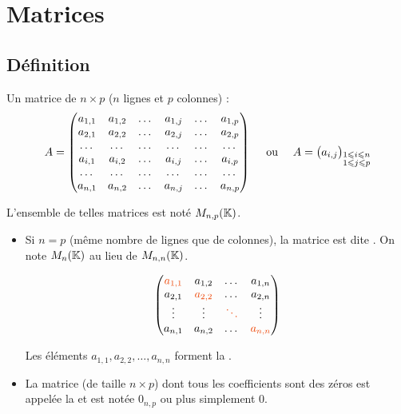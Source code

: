 \documentclass[10pt,class=article,crop=false]{standalone}
\begin{document}
	
\section{Matrices}

\begin{multicols}{2}


\subsection{Définition}


Un matrice de  $n \times p$ ($n$ lignes et $p$ colonnes) : 
$$A=\begin{pmatrix}
	a_{1,1}& a_{1,2}& \dots & a_{1,j}& \dots & a_{1,p}\cr
	a_{2,1}& a_{2,2}& \dots & a_{2,j}& \dots &a_{2,p}\cr
	\dots & \dots & \dots & \dots & \dots & \dots \cr
	a_{i,1}& a_{i,2} & \dots & a_{i,j}& \dots &a_{i,p} \cr
	\dots & \dots & \dots & \dots & \dots & \dots \cr
	a_{n,1}& a_{n,2}& \dots & a_{n,j}& \dots & a_{n,p}\cr
\end{pmatrix}
\quad \text{ ou } \quad
A= \big(a_{i,j}\big)_{\substack{1\leq i \leq n \\ 1\leq j \leq p}}
$$


L'ensemble de telles matrices est noté $M_{n,p}(\Kk)$.



\begin{itemize}
	\item Si $n=p$ (même nombre de lignes que de colonnes), la matrice est dite 
	.
	On note $M_{n}(\Kk)$ au lieu de $M_{n,n}(\Kk)$.
	
	\[
	\begin{pmatrix}
		{\color{myred}a_{1,1}} & a_{1,2} & \dots & a_{1,n}\\
		a_{2,1} & {\color{myred}a_{2,2}} & \dots & a_{2,n}\\
		\vdots& \vdots & {\color{myred}\ddots}  & \vdots\\
		a_{n,1} & a_{n,2} & \dots & {\color{myred}a_{n,n}}
	\end{pmatrix}
	\]
	
	Les éléments $a_{1,1}, a_{2,2}, \ldots, a_{n,n}$ forment la .
	

	\item La matrice (de taille $n\times p$) dont tous les coefficients sont des zéros
	est appelée la  et est notée $0_{n,p}$ ou plus simplement $0$.
	

\end{itemize}
\end{multicols}
\end{document}
